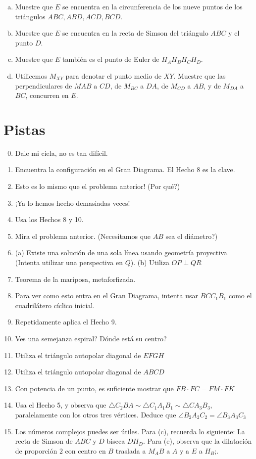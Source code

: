 \documentclass[11pt, a4paper]{article}
\begin{document}
\begin{enumerate}
\begin{enumerate}[(a)]
	\item Muestre que $E$ se encuentra en la circunferencia de los nueve puntos de los tri\'angulos $ABC, ABD, ACD, BCD$.
	\item Muestre que $E$ se encuentra en la recta de Simson del tri\'angulo $ABC$ y el punto $D$.
	\item Muestre que $E$ tambi\'en es el punto de Euler de $H_AH_BH_CH_D$.
	\item Utilicemos $M_{XY}$ para denotar el punto medio de $XY$. Muestre que las perpendiculares de $M{AB}$ a $CD$, de $M_{BC}$ a $DA$, de $M_{CD}$ a $AB$, y de $M_{DA}$ a $BC$, concurren en $E$. 
\end{enumerate}
\end{enumerate}
\section{Pistas}
\begin{enumerate}
	\setcounter{enumi}{-1}
	\item Dale mi ciela, no es tan dif\'icil.
	\item Encuentra la configuraci\'on en el Gran Diagrama. El Hecho 8 es la clave.
	\item Esto es lo mismo que el problema anterior! (Por qu\'e?)
	\item ¡Ya lo hemos hecho demasiadas veces!
	\item Usa los Hechos 8 y 10.
	\item Mira el problema anterior. (Necesitamos que $AB$ sea el di\'ametro?)
	\item (a) Existe una soluci\'on de una sola l\'inea usando geometr\'ia proyectiva (Intenta utilizar una perspectiva en $Q$). (b) Utiliza $OP \perp QR$
	\item Teorema de la mariposa, metaforfizada.
	\item Para ver como esto entra en el Gran Diagrama, intenta usar $BCC_1B_1$ como el cuadril\'atero c\'iclico inicial.
	\item Repetidamente aplica el Hecho 9.
	\item Ves una semejanza espiral? D\'onde est\'a su centro?
	\item Utiliza el tri\'angulo autopolar diagonal de $EFGH$
	\item Utiliza el tri\'angulo autopolar diagonal de $ABCD$
	\item Con potencia de un punto, es suficiente mostrar que $FB \cdot FC = FM \cdot FK$
	\item Usa el Hecho 5, y observa que $\triangle C_2BA \sim \triangle C_1A_1B_1 \sim \triangle CA_3B_3$, paralelamente con los otros tres v\'ertices. Deduce que $\angle B_2A_2C_2 = \angle B_3A_3C_3$
	\item Los n\'umeros complejos puedes ser \'utiles. Para (c), recuerda lo siguiente: La recta de Simson de $ABC$ y $D$ biseca $DH_D$. Para (e), observa que la dilataci\'on de proporci\'on $2$ con centro en $B$ traslada a $M_AB$ a $A$ y a $E$ a $H_B$;.
\end{enumerate}
	
	
\end{document}
